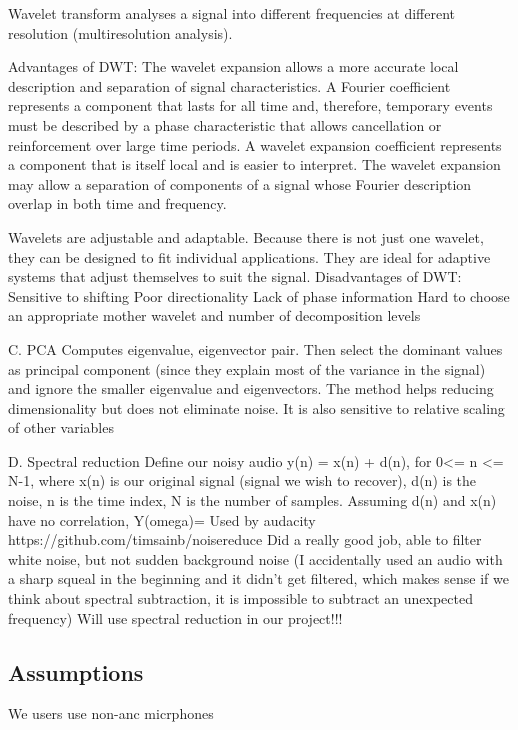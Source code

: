 \begin{enumerate}
	Wavelet transform analyses a signal into different frequencies at different resolution (multiresolution analysis). 

Advantages of DWT:
	The wavelet expansion allows a more accurate local description and separation of signal characteristics. A 
	Fourier coefficient represents a component that lasts for all time and, therefore, temporary events must be 
	described by a phase characteristic that allows cancellation or reinforcement over large time periods. 
	A wavelet expansion coefficient represents a component that is itself local and is easier to interpret. 
	The wavelet expansion may allow a separation of components of a signal whose Fourier description overlap in both time and frequency.
	
	Wavelets are adjustable and adaptable. Because there is not just one wavelet, they can be designed to fit 
	individual applications. They are ideal for adaptive systems that adjust themselves to suit the signal.
Disadvantages of DWT:
	Sensitive to shifting
	Poor directionality
	Lack of phase information
	Hard to choose an appropriate mother wavelet and number of decomposition levels

C. PCA
Computes eigenvalue, eigenvector pair. Then select the dominant values as principal component (since they explain most of the variance in the signal) and ignore the smaller eigenvalue and eigenvectors.
The method helps reducing dimensionality but does not eliminate noise. It is also sensitive to relative scaling of other variables 


D. Spectral reduction
Define our noisy audio y(n) = x(n) + d(n), for 0<= n <= N-1, where x(n) is our original signal (signal we wish to recover), d(n) is the noise, n is the time index, N is the number of samples. 
Assuming d(n) and x(n) have no correlation, Y(omega)= 
Used by audacity
https://github.com/timsainb/noisereduce
	Did a really good job, able to filter white noise, but not sudden background noise (I accidentally used an audio with a sharp squeal in the beginning and it didn’t get filtered, which makes sense if we think about spectral subtraction, it is impossible to subtract an unexpected frequency)
	Will use spectral reduction in our project!!! 
\end{enumerate}

\subsection{Assumptions}
We 
users use non-anc micrphones

